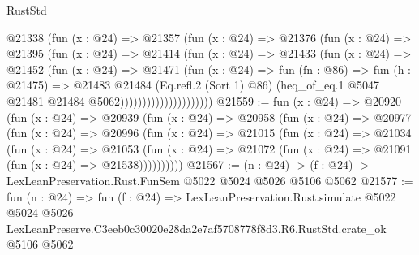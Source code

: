 \begin{lexlean}{RustStd}
\begin{coremodule}
                          @21338
                            (fun (x : @24) =>
                            @21357
                              (fun (x : @24) =>
                              @21376
                                (fun (x : @24) =>
                                @21395
                                  (fun (x : @24) =>
                                  @21414
                                    (fun (x : @24) =>
                                    @21433
                                      (fun (x : @24) =>
                                      @21452
                                        (fun (x : @24) =>
                                        @21471
                                          (fun (x : @24) =>
                                          fun (fn : @86) =>
                                          fun (h : @21475) =>
                                          @21483
                                            @21484
                                            (Eq.refl.{2} (Sort 1) @86)
                                            (heq_of_eq.{1}
                                              @5047
                                              @21481
                                              @21484
                                              @5062)))))))))))))))))))))
@21559 := fun (x : @24) =>
  @20920
    (fun (x : @24) =>
    @20939
      (fun (x : @24) =>
      @20958
        (fun (x : @24) =>
        @20977
          (fun (x : @24) =>
          @20996
            (fun (x : @24) =>
            @21015
              (fun (x : @24) =>
              @21034
                (fun (x : @24) =>
                @21053
                  (fun (x : @24) =>
                  @21072 (fun (x : @24) => @21091 (fun (x : @24) => @21538))))))))))
@21567 := (n : @24) -> (f : @24) -> LexLeanPreservation.Rust.FunSem @5022 @5024 @5026 @5106 @5062
@21577 := fun (n : @24) =>
  fun (f : @24) =>
  LexLeanPreservation.Rust.simulate
    @5022
    @5024
    @5026
    LexLeanPreserve.C3eeb0c30020e28da2e7af5708778f8d3.R6.RustStd.crate_ok
    @5106
    @5062
\end{coremodule}
\end{lexlean}
